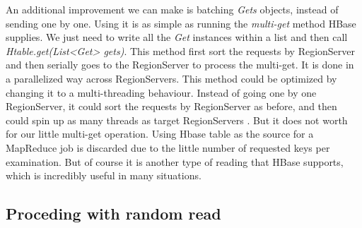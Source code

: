 An additional improvement we can make is batching \textit{Gets} objects, instead of sending one by one. Using it is as simple as running the \textit{multi-get} method HBase supplies. We just need to write all the \textit{Get} instances within a list and then call \textit{Htable.get(List<Get> gets)}. This method first sort the requests by RegionServer and then serially goes to the RegionServer to process the multi-get. It is done in a parallelized way across RegionServers. 
This method could be optimized by changing it to a multi-threading behaviour. Instead of going one by one RegionServer, it could sort the requests by RegionServer as before, and then could spin up as many threads as target RegionServers \cite{http://comments.gmane.org/gmane.comp.java.hadoop.hbase.user/34417}. But it does not worth for our little multi-get operation.
\bigskip
Using Hbase table as the source for a MapReduce job is discarded due to the little number of requested keys per examination. But of course it is another type of reading that HBase supports, which is incredibly useful in many situations. 
\par

\subsection{Proceding with random read}

